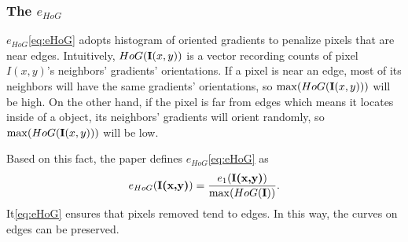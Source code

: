 \documentclass[final]{cvpr}
\begin{document}
\subsubsection{The $e_{HoG}$}
$e_{HoG}$\ref{eq:eHoG} adopts histogram of oriented gradients\cite{dalal2005histograms} to penalize pixels that are near edges.
Intuitively, $HoG(\textbf I(x,y))$ is a vector recording counts of pixel $I(x,y)$'s neighbors' gradients' orientations.
If a pixel is near an edge, most of its neighbors will have the same gradients' orientations, so $\max(HoG(\textbf I(x,y)))$ will be high.
On the other hand, if the pixel is far from edges which means it locates inside of a object, its neighbors' gradients will orient randomly, so $\max(HoG(\textbf I(x,y)))$ will be low.

Based on this fact, the paper\cite{avidan2007seam} defines $e_{HoG}$\ref{eq:eHoG} as
\begin{equation}
    e_{HoG}(\textbf{I(x,y)})=\frac{e_1(\textbf{I(x,y)})}{\max(HoG(\textbf I))}.
    \label{eq:eHoG}
\end{equation}
It\ref{eq:eHoG} ensures that pixels removed tend to edges.
In this way, the curves on edges can be preserved.
\end{document}
